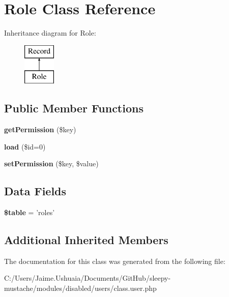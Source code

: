 \hypertarget{class_role}{\section{Role Class Reference}
\label{class_role}
}
Inheritance diagram for Role\-:\begin{figure}[H]
\begin{center}
\leavevmode
\includegraphics[height=2.000000cm]{class_role}
\end{center}
\end{figure}
\subsection*{Public Member Functions}
\begin{DoxyCompactItemize}
\item 
\hypertarget{class_role_a610dd05d53d99e1ddc05596468eb4914}{{\bfseries get\-Permission} (\$key)}\label{class_role_a610dd05d53d99e1ddc05596468eb4914}

\item 
\hypertarget{class_role_a7160b09d9d37ede69811a66dc9e4f272}{{\bfseries load} (\$id=0)}\label{class_role_a7160b09d9d37ede69811a66dc9e4f272}

\item 
\hypertarget{class_role_a20b0e06124acf9f1e66afa1b1c8f996a}{{\bfseries set\-Permission} (\$key, \$value)}\label{class_role_a20b0e06124acf9f1e66afa1b1c8f996a}

\end{DoxyCompactItemize}
\subsection*{Data Fields}
\begin{DoxyCompactItemize}
\item 
\hypertarget{class_role_ae8876a14058f368335baccf35af4a22b}{{\bfseries \$table} = 'roles'}\label{class_role_ae8876a14058f368335baccf35af4a22b}

\end{DoxyCompactItemize}
\subsection*{Additional Inherited Members}


The documentation for this class was generated from the following file\-:\begin{DoxyCompactItemize}
\item 
C\-:/\-Users/\-Jaime.\-Ushuaia/\-Documents/\-Git\-Hub/sleepy-\/mustache/modules/disabled/users/class.\-user.\-php\end{DoxyCompactItemize}
